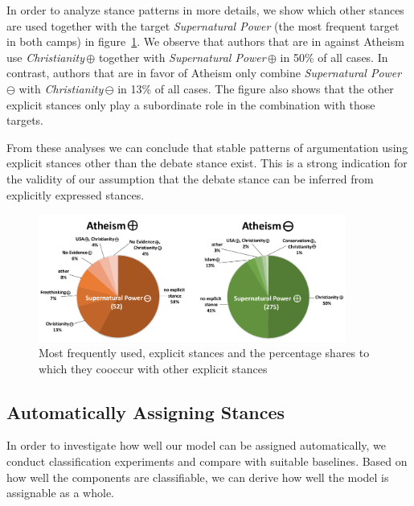 \documentclass[11pt]{article}
\begin{document}
In order to analyze stance patterns in more details, we show which other stances are used together with the target \textit{Supernatural Power} (the most frequent target in both camps) in figure~\ref{fig:patterns_combined}.
We observe that authors that are in against Atheism use \textit{Christianity}\,$\oplus$ together with \textit{Supernatural Power}\,$\oplus$ in 50\% of all cases.
In contrast, authors that are in favor of Atheism only combine \textit{Supernatural Power}\,$\ominus$ with \textit{Christianity}\,$\ominus$ in 13\% of all cases.
The figure also shows that the other explicit stances only play a subordinate role in the combination with those targets.

From these analyses we can conclude that stable patterns of argumentation using explicit stances other than the debate stance exist.
This is a strong indication for the validity of our assumption that the debate stance can be inferred from explicitly expressed stances.


\begin{figure}
\centering
  \includegraphics[width=0.9\textwidth]{figures/combinedPatterns_reduced.png}
   \caption{Most frequently used, explicit stances and the percentage shares to which they cooccur with other explicit stances}
  \label{fig:patterns_combined}
\end{figure}

\subsection{Automatically Assigning Stances}
In order to investigate how well our model can be assigned automatically, we conduct classification experiments and compare with suitable baselines.
Based on how well the components are classifiable, we can derive how well the model is assignable as a whole.
\end{document}
